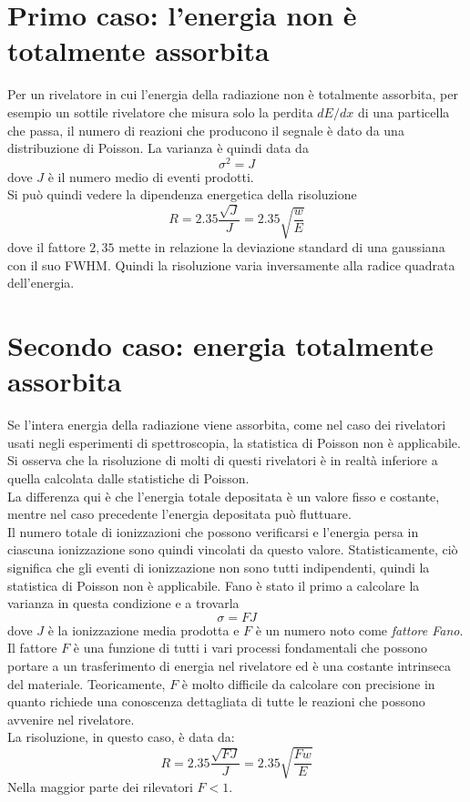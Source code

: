 \documentclass[12pt, letterpaper]{book}
\begin{document}
\section{Primo caso: l'energia non è totalmente assorbita}
Per un rivelatore in cui l'energia della radiazione non è totalmente assorbita, per esempio un sottile rivelatore che misura solo la perdita $dE/dx$ di una particella che passa, il numero di reazioni che producono il segnale è dato da una distribuzione di Poisson. La varianza è quindi data da
$$\sigma^2=J$$
dove $J$ è il numero medio di eventi prodotti.\\ 
Si può quindi vedere la dipendenza energetica della risoluzione
$$R=2.35\frac{\sqrt{J}}{J}=2.35\sqrt{\frac{w}{E}}$$
dove il fattore $2,35$ mette in relazione la deviazione standard di una gaussiana con il suo FWHM. Quindi la risoluzione varia inversamente alla radice quadrata dell'energia.

\section{Secondo caso: energia totalmente assorbita}
Se l'intera energia della radiazione viene assorbita, come nel caso dei rivelatori usati negli esperimenti di spettroscopia, la statistica di Poisson non è applicabile. Si osserva che la risoluzione di molti di questi rivelatori è in realtà inferiore a quella calcolata dalle statistiche di Poisson.\\ 
La differenza qui è che l'energia totale depositata è un valore fisso e costante, mentre nel caso precedente l'energia depositata può fluttuare.\\ 
Il numero totale di ionizzazioni che possono verificarsi e l'energia persa in ciascuna ionizzazione sono quindi vincolati da questo valore. Statisticamente, ciò significa che gli eventi di ionizzazione non sono tutti indipendenti, quindi la statistica di Poisson non è applicabile. Fano è stato il primo a calcolare la varianza in questa condizione e a trovarla
$$\sigma=FJ$$
dove $J$ è la ionizzazione media prodotta e $F$ è un numero noto come \textit{fattore Fano}.\\
Il fattore $F$ è una funzione di tutti i vari processi fondamentali che possono portare a un trasferimento di energia nel rivelatore ed è una costante intrinseca del materiale. Teoricamente, $F$ è molto difficile da calcolare con precisione in quanto richiede una conoscenza dettagliata di tutte le reazioni che possono avvenire nel rivelatore.\\
La risoluzione, in questo caso, è data da:
$$R=2.35\frac{\sqrt{FJ}}{J}=2.35\sqrt{\frac{Fw}{E}}$$
Nella maggior parte dei rilevatori $F<1$.
\end{document}
